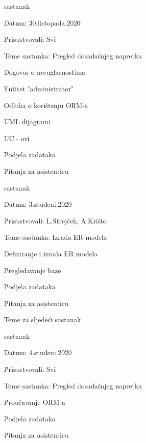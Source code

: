 \begin{packed_enum}
			\item  sastanak
			\item[] \begin{packed_item}
				\item Datum: 30.listopada.2020
				\item Prisustvovali: Svi
				\item Teme sastanka: Pregled dosadašnjeg napretka
				\begin{packed_item}
				    \item Dogovor o nesuglasnostima
					\item Entitet "administrator"
					\item Odluka o korištenju ORM-a
					\item UML dijagrami
					\item UC - ovi
					\item Podjela zadataka
					\item Pitanja za asistenticu
				\end{packed_item}
			\end{packed_item}
			
			
			\item  sastanak
			\item[] \begin{packed_item}
				\item Datum: 3.studeni.2020
				\item Prisustvovali: L.Strejček, A.Krišto
				\item Teme sastanka: Izrada ER modela
				\begin{packed_item}
				    \item Definiranje i izrada ER modela
					\item Pregledavanje baze
					\item Podjela zadataka
					\item Pitanja za asistenticu
					\item Teme za sljedeći sastanak
				\end{packed_item}
			\end{packed_item}
			
			\item  sastanak
			\item[] \begin{packed_item}
				\item Datum: 4.studeni.2020
				\item Prisustvovali: Svi
				\item Teme sastanka: Pregled dosadašnjeg napretka
				\begin{packed_item}
				    \item Proučavanje ORM-a
					\item Podjela zadataka
					\item Pitanja za asistenticu
				\end{packed_item}
			\end{packed_item}
			

\end{packed_enum}
